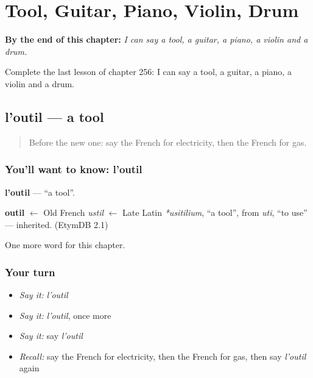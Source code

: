 
\chapter{Tool, Guitar, Piano, Violin, Drum}
\label{ch:fr-tool-guitar-piano-violin-drum}

\begin{chapteropening}
\textbf{By the end of this chapter:} \emph{I can say a tool, a guitar, a piano, a violin and a drum.}

Complete the last lesson of chapter 256: I can say a tool, a guitar, a piano, a violin and a drum.
\end{chapteropening}

\section[l'outil]{l'outil — a tool}

\label{lesson:FR-C256-outil}



\begin{quote}
Before the new one: say the French for electricity, then the French for gas.
\end{quote}

\subsection*{You'll want to know: l'outil}
\textbf{l'outil} — \textquotedblleft{}a tool\textquotedblright{}.

\begin{cousinweb}
\textbf{outil} $\leftarrow$ Old French \emph{ustil} $\leftarrow$ Late Latin \emph{*usitilium}, \textquotedblleft{}a tool\textquotedblright{}, from \emph{uti}, \textquotedblleft{}to use\textquotedblright{} — inherited. (EtymDB 2.1)
\end{cousinweb}

\begin{grammarlens}[title={What you've built}]
One more word for this chapter.
\end{grammarlens}

\subsection*{Your turn}
\begin{itemize}
\raggedright
  \item \emph{Say it:} \emph{l'outil}
  \item \emph{Say it:} \emph{l'outil}, once more
  \item \emph{Say it:} say \emph{l'outil}
  \item \emph{Recall:} say the French for electricity, then the French for gas, then say \emph{l'outil} again
\end{itemize}

